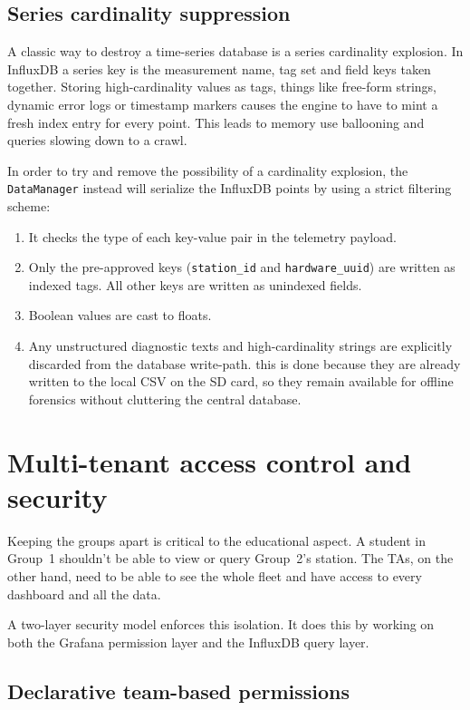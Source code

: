 \subsection{Series cardinality suppression}
A classic way to destroy a time-series database is a series cardinality explosion. In InfluxDB a series key is the measurement name, tag set and field keys taken together. Storing high-cardinality values as tags, things like free-form strings, dynamic error logs or timestamp markers causes the engine to have to mint a fresh index entry for every point. This leads to memory use ballooning and queries slowing down to a crawl.

In order to try and remove the possibility of a cardinality explosion, the \texttt{DataManager} instead will serialize the InfluxDB points by using a strict filtering scheme:
\begin{enumerate}
    \item It checks the type of each key-value pair in the telemetry payload.
    \item Only the pre-approved keys (\texttt{station\_id} and \texttt{hardware\_uuid}) are written as indexed tags. All other keys are written as unindexed fields.
    \item Boolean values are cast to floats.
    \item Any unstructured diagnostic texts and high-cardinality strings are explicitly discarded from the database write-path. this is done because they are already written to the local CSV on the SD card, so they remain available for offline forensics without cluttering the central database.
\end{enumerate}


\section{Multi-tenant access control and security}

Keeping the groups apart is critical to the educational aspect. A student in Group~1 shouldn't be able to view or query Group~2's station. The TAs, on the other hand, need to be able to see the whole fleet and have access to every dashboard and all the data.

A two-layer security model enforces this isolation. It does this by working on both the Grafana permission layer and the InfluxDB query layer.

\subsection{Declarative team-based permissions}

